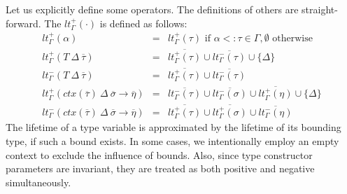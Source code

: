 \documentclass[acmsmall,review,screen]{acmart}
\newcommand{\ap}{~}
\newcommand{\ctx}[1]{ctx\left(#1\right)~}
\begin{document}
Let us explicitly define some operators.
The definitions of others are straight-forward.
The $lt_\Gamma^+(\cdot)$ is defined as follows:
\[
    \begin{array}{lll}
        lt_\Gamma^+(\alpha) & = & lt_\Gamma^+(\tau) \text{ if } \alpha <: \tau \in \Gamma, \emptyset \text{ otherwise} \\
        lt_\Gamma^+(T\ap\Delta\ap\overline{\tau}) & = & \overline{lt_\Gamma^+(\tau)} \cup \overline{lt_\Gamma^-(\tau)} \cup \{\Delta\} \\
        lt_\Gamma^-(T\ap\Delta\ap\overline{\tau}) & = & \overline{lt_\Gamma^+(\tau)} \cup \overline{lt_\Gamma^-(\tau)} \\
        lt_\Gamma^{+}(\ctx{\overline{\tau}}\Delta~\overline{\sigma}\to\overline{\eta}) & = & \overline{lt_\Gamma^{-}(\tau)} \cup \overline{lt_\Gamma^{-}(\sigma)} \cup \overline{lt_\Gamma^{+}(\eta)} \cup \{\Delta\} \\
        lt_\Gamma^{-}(\ctx{\overline{\tau}}\Delta~\overline{\sigma}\to\overline{\eta}) & = & \overline{lt_\Gamma^{+}(\tau)} \cup \overline{lt_\Gamma^{+}(\sigma)} \cup \overline{lt_\Gamma^{-}(\eta)}
    \end{array}
\]
The lifetime of a type variable is approximated by the lifetime of its bounding type, if such a bound exists.
In some cases, we intentionally employ an empty context to exclude the influence of bounds.
Also, since type constructor parameters are invariant, they are treated as both positive and negative simultaneously.
\end{document}
